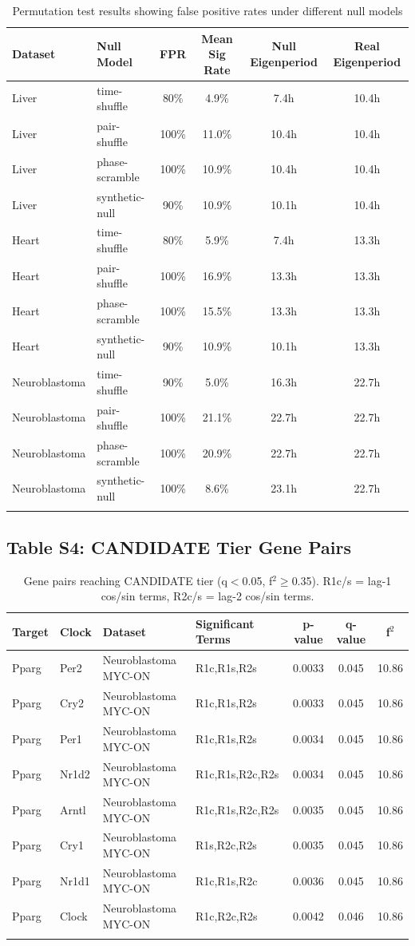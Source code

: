 \documentclass[11pt,a4paper]{article}
\begin{document}
\begin{longtable}{llcccc}
\toprule
Dataset & Null Model & FPR & Mean Sig Rate & Null Eigenperiod & Real Eigenperiod \\
\midrule
\endfirsthead
Liver & time-shuffle & 80\% & 4.9\% & 7.4h & 10.4h \\
Liver & pair-shuffle & 100\% & 11.0\% & 10.4h & 10.4h \\
Liver & phase-scramble & 100\% & 10.9\% & 10.4h & 10.4h \\
Liver & synthetic-null & 90\% & 10.9\% & 10.1h & 10.4h \\
\midrule
Heart & time-shuffle & 80\% & 5.9\% & 7.4h & 13.3h \\
Heart & pair-shuffle & 100\% & 16.9\% & 13.3h & 13.3h \\
Heart & phase-scramble & 100\% & 15.5\% & 13.3h & 13.3h \\
Heart & synthetic-null & 90\% & 10.9\% & 10.1h & 13.3h \\
\midrule
Neuroblastoma & time-shuffle & 90\% & 5.0\% & 16.3h & 22.7h \\
Neuroblastoma & pair-shuffle & 100\% & 21.1\% & 22.7h & 22.7h \\
Neuroblastoma & phase-scramble & 100\% & 20.9\% & 22.7h & 22.7h \\
Neuroblastoma & synthetic-null & 100\% & 8.6\% & 23.1h & 22.7h \\
\bottomrule
\caption{Permutation test results showing false positive rates under different null models}
\end{longtable}

\subsection{Table S4: CANDIDATE Tier Gene Pairs}

\begin{longtable}{llllccc}
\toprule
Target & Clock & Dataset & Significant Terms & p-value & q-value & f$^2$ \\
\midrule
\endfirsthead
Pparg & Per2 & Neuroblastoma MYC-ON & R1c,R1s,R2s & 0.0033 & 0.045 & 10.86 \\
Pparg & Cry2 & Neuroblastoma MYC-ON & R1c,R1s,R2s & 0.0033 & 0.045 & 10.86 \\
Pparg & Per1 & Neuroblastoma MYC-ON & R1c,R1s,R2s & 0.0034 & 0.045 & 10.86 \\
Pparg & Nr1d2 & Neuroblastoma MYC-ON & R1c,R1s,R2c,R2s & 0.0034 & 0.045 & 10.86 \\
Pparg & Arntl & Neuroblastoma MYC-ON & R1c,R1s,R2c,R2s & 0.0035 & 0.045 & 10.86 \\
Pparg & Cry1 & Neuroblastoma MYC-ON & R1s,R2c,R2s & 0.0035 & 0.045 & 10.86 \\
Pparg & Nr1d1 & Neuroblastoma MYC-ON & R1c,R1s,R2c & 0.0036 & 0.045 & 10.86 \\
Pparg & Clock & Neuroblastoma MYC-ON & R1c,R2c,R2s & 0.0042 & 0.046 & 10.86 \\
\bottomrule
\caption{Gene pairs reaching CANDIDATE tier (q$<$0.05, f$^2 \geq$0.35). R1c/s = lag-1 cos/sin terms, R2c/s = lag-2 cos/sin terms.}
\end{longtable}
\end{document}
